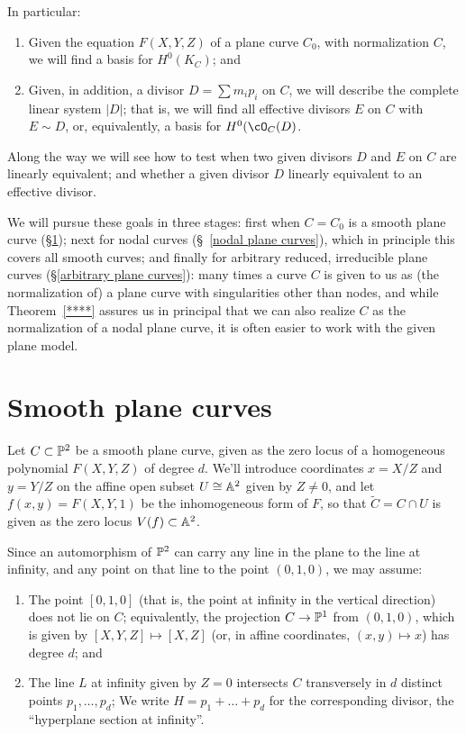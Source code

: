 In particular:
\begin{enumerate}
\item Given the equation $F(X,Y,Z)$ of a plane curve $C_0$, with normalization $C$, we will find a basis for $H^0(K_C)$; and
\item  Given, in addition, a divisor $D = \sum m_ip_i$ on $C$, we will describe the complete linear system $|D|$; that is, we will find all effective divisors $E$ on $C$ with $E \sim D$, or, equivalently, a basis for $H^0(\cO_C(D)$.
\end{enumerate}

Along the way we will see how to test when two given divisors $D$ and $E$ on $C$ are linearly equivalent; and whether a given divisor $D$ linearly equivalent to an effective divisor.

We will pursue these goals in three stages: first when $C = C_0$ is a smooth plane curve (\S \ref{smooth plane curves}); next for nodal curves (\S~\ref{nodal plane curves}), which in principle this covers all smooth curves; and finally for arbitrary reduced, irreducible plane curves (\S\ref{arbitrary plane curves}): many times a curve $C$ is given to us as (the normalization of) a plane curve with singularities other than nodes, and while Theorem~\ref{****} assures us in principal that we can also realize $C$ as the normalization of a nodal plane curve, it is often easier to work with the given plane model. 

\section{Smooth plane curves}\label{smooth plane curves}

Let $C \subset \PP^2$  be a smooth plane curve, given as the zero locus of a homogeneous polynomial $F(X,Y,Z)$ of degree $d$. We'll introduce coordinates $x = X/Z$ and $y = Y/Z$ on the affine open subset $U \cong \AA^2$ given by $Z \neq 0$, and let $f(x,y) = F(X,Y,1)$ be the inhomogeneous form of $F$, so that $\tilde C = C \cap U$ is given as the zero locus $V(f) \subset  \AA^2$. 

Since an automorphism of $\PP^2$ can carry any line in the plane to the line at infinity, and any point on that line to the point $(0,1,0)$, we may assume:
\begin{enumerate}
\item The point $[0,1,0]$ (that is, the point at infinity in the vertical direction) does not lie on $C$; equivalently,  the projection $C \to \PP^1$ from $(0,1,0)$, which is given by $[X,Y,Z] \mapsto [X,Z]$ (or, in affine coordinates, $(x,y) \mapsto x$)  has degree $d$; and
\item The line $L$ at infinity given by $Z = 0$ intersects $C$ transversely in $d$ distinct points $p_1, \dots, p_d$; We write $H = p_1+ \dots +p_d$ for the corresponding divisor, the ``hyperplane section at infinity''.
\end{enumerate}

